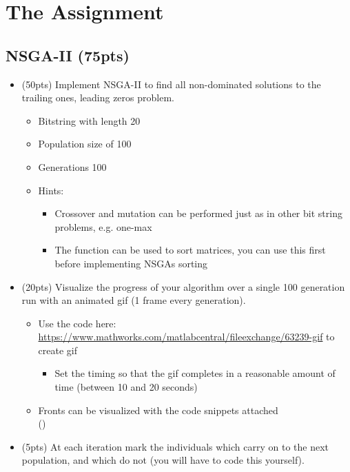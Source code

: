\documentclass[11pt, a4paper]{article}
\begin{document}
\newpage
\section{The Assignment}

\subsection{NSGA-II (75pts)}
\begin{itemize}
	\item (50pts) Implement NSGA-II to find all non-dominated solutions to the trailing ones, leading zeros problem.
	\begin{itemize}
		\item Bitstring with length 20
		\item Population size of 100
		\item Generations 100
		\item Hints:
		\begin{itemize}
			\item Crossover and mutation can be performed just as in other bit string problems, e.g. one-max
			\item The  function can be used to sort matrices, you can use this first before implementing NSGAs sorting
		\end{itemize}
	\end{itemize}
	\item (20pts) Visualize the progress of your algorithm over a single 100 generation run with an animated gif (1 frame every generation).
	\begin{itemize}
		\item Use the code here: \url{https://www.mathworks.com/matlabcentral/fileexchange/63239-gif} to create gif
		\begin{itemize}
			\item Set the timing so that the gif completes in a reasonable amount of time (between 10 and 20 seconds)
		\end{itemize}
		\item Fronts can be visualized with the code snippets attached\\ ()
	\end{itemize}
	\item (5pts) At each iteration mark the individuals which carry on to the next population, and which do not (you will have to code this yourself).
\end{itemize}

\newpage
\end{document}
